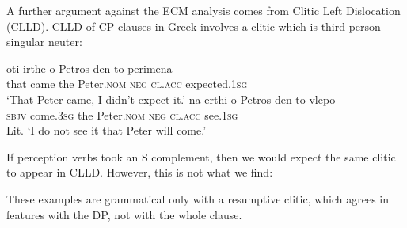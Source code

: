 \documentclass[output=paper]{langsci/langscibook}
\begin{document}
  A further argument against the ECM analysis comes from Clitic Left Dislocation (CLLD). CLLD of CP clauses in Greek involves a clitic which is third person singular neuter:

\ea%
    \label{ex:alexiadou:39}
    \ea
    \gll oti   irthe   o     Petros      den  to       perimena\\
          that  came the  Peter.\textsc{nom}  \textsc{neg}  \textsc{cl.acc} expected{}.\textsc{1sg}\\
    \glt ‘That Peter came, I didn't expect it.’
    \ex
    \gll na    erthi         o   Petros       den   to      vlepo\\
         \textsc{sbjv} come{}.\textsc{3sg} the Peter.\textsc{nom}  \textsc{neg}  \textsc{cl.acc} see{}.\textsc{1sg}\\
    \glt Lit. ‘I do not see it that Peter will come.’
    \z
\z    
 
If perception verbs took an S complement, then we would expect the same clitic to appear in CLLD. However, this is not what we find:

\ea%
    \label{ex:alexiadou:40}
    \z
\z  

These examples are grammatical only with a resumptive clitic, which agrees in features with the DP, not with the whole clause.{} 
\end{document}
